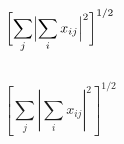 \documentclass{article} %
\begin{document}
$$\biggl[ \sum_j \Bigl| \sum_i x_{ij} \Bigr|^2 \biggr]^{1/2}$$\\

$$\left[ \sum_j \left| \sum_i x_{ij} \right|^2\right]^{1/2}$$ \\
\end{document}
